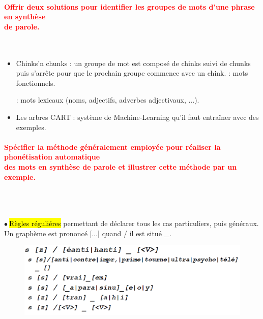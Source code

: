 \documentclass[letterpaper, 12pt]{article}
\newcommand{\red}[1]{
	\textcolor{red}{#1}
}
\newcommand{\myul}[1]{
	\underline{\smash{#1}}
}
\newcommand{\point}{$\bullet\ $}
\begin{document}
		\paragraph{\red{Offrir deux solutions pour identifier les groupes de mots d'une phrase en synthèse 
		~\\ \hspace*{0.035cm} de parole.}}~\\
			\vspace*{-0.5cm}
			\begin{itemize}
				\setlength{\itemsep}{0pt}		
				\setlength{\parskip}{0pt}		
				\setlength{\parsep}{0pt}	
				\item Chinks'n chunks : un groupe de mot est composé de chinks suivi de chunks puis s'arrête 
					pour que le prochain groupe commence avec un chink. \myul{\hl{Chink}}: mots fonctionnels.
					\myul{\hl{Chunk}}: mots lexicaux (noms, adjectifs, adverbes adjectivaux, ...).
				\item Les arbres CART : système de Machine-Learning qu'il faut entraîner avec des exemples.
			\end{itemize}
		\paragraph{\red{Spécifier la méthode généralement employée pour réaliser la phonétisation automatique
		~\\ \hspace*{0.035cm} des mots en synthèse de parole et illustrer cette méthode par un exemple.}}~\\~\\
    		\begin{minipage}{0.4\textwidth}
    			\point \hl{R\`egles r\'eguli\'eres} permettant de déclarer tous les cas particuliers, puis généraux.
    				Un graphème  est prononcé [...] quand / il est situé \_.
    		\end{minipage}\hfill
    		\begin{minipage}{0.55\textwidth}
    			\begin{figure}[H]
    				\centering
    				\includegraphics[scale=0.5]{Images/phonetization2}
    			\end{figure}\noindent
    		\end{minipage}
\end{document}

